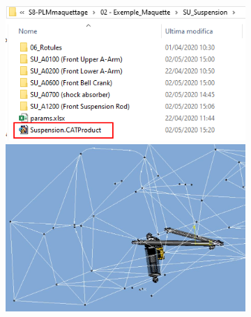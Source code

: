 \begin{figure}
    \centering
    \begin{subfigure}{.5\textwidth}
        \centering
        \includegraphics[width=\textwidth]{img/susp_file.png}
        \includegraphics[width=\textwidth]{img/susp_screen.JPG}
    \end{subfigure}{}
    \begin{subfigure}{.25\textwidth}
        \centering

\end{subfigure}
\end{figure}
